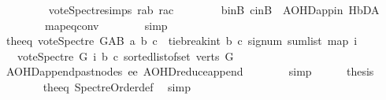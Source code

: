 \begin{isabellebody}
\ \ \ \ \ \ \isamarkupfalse%
\ \ vote{\isacharunderscore}{\kern0pt}Spectre{\isachardot}{\kern0pt}simps\ r{\isacharunderscore}{\kern0pt}ab\ r{\isacharunderscore}{\kern0pt}ac\isanewline
\ \ \ \ \ \ \ \ b{\isacharunderscore}{\kern0pt}inB\ c{\isacharunderscore}{\kern0pt}inB\ \ AOHD{\isachardot}{\kern0pt}app{\isacharunderscore}{\kern0pt}in{}\ H{}{\isachardot}{\kern0pt}bD{\isacharunderscore}{\kern0pt}A\isanewline
\ \ \ \ \ \ \ \ map{\isacharunderscore}{\kern0pt}eq{\isacharunderscore}{\kern0pt}conv\isanewline
\ \ \ \ \ \ \isamarkupfalse%
\ simp\ \isanewline
\ \ \ \ \isamarkupfalse%
\ the{\isacharunderscore}{\kern0pt}eq{\isacharcolon}{\kern0pt}\ {\isachardoublequoteopen}vote{\isacharunderscore}{\kern0pt}Spectre\ G{\isacharunderscore}{\kern0pt}AB\ a\ b\ c\ {\isacharequal}{\kern0pt}\ {\isacharparenleft}{\kern0pt}tie{\isacharunderscore}{\kern0pt}break{\isacharunderscore}{\kern0pt}int\ b\ c\ {\isacharparenleft}{\kern0pt}signum\ {\isacharparenleft}{\kern0pt}sum{\isacharunderscore}{\kern0pt}list\ {\isacharparenleft}{\kern0pt}map\ {\isacharparenleft}{\kern0pt}{\isasymlambda}i{\isachardot}{\kern0pt}\isanewline
\ \ \ {\isacharparenleft}{\kern0pt}vote{\isacharunderscore}{\kern0pt}Spectre\ G\ i\ b\ c{\isacharparenright}{\kern0pt}{\isacharparenright}{\kern0pt}\ {\isacharparenleft}{\kern0pt}sorted{\isacharunderscore}{\kern0pt}list{\isacharunderscore}{\kern0pt}of{\isacharunderscore}{\kern0pt}set\ {\isacharparenleft}{\kern0pt}verts\ G{\isacharparenright}{\kern0pt}{\isacharparenright}{\kern0pt}{\isacharparenright}{\kern0pt}{\isacharparenright}{\kern0pt}{\isacharparenright}{\kern0pt}{\isacharparenright}{\kern0pt}{\isachardoublequoteclose}\isanewline
\ \ \ \ \ \ \isamarkupfalse%
\ AOHD{\isachardot}{\kern0pt}append{\isacharunderscore}{\kern0pt}past{\isacharunderscore}{\kern0pt}nodes{}\ ee{}\ AOHD{\isachardot}{\kern0pt}reduce{\isacharunderscore}{\kern0pt}append{}\isanewline
\ \ \ \ \ \ \isamarkupfalse%
\ simp\isanewline
\ \ \ \ \isamarkupfalse%
\ {\isacharquery}{\kern0pt}thesis\ \isanewline
\ \ \ \ \ \ \isamarkupfalse%
\ the{\isacharunderscore}{\kern0pt}eq\ Spectre{\isacharunderscore}{\kern0pt}Order{\isacharunderscore}{\kern0pt}def\ \isamarkupfalse%
\ simp\ \isanewline
\ \ \isamarkupfalse%
\isanewline
{}\isamarkupfalse%
%
\endisatagproof
{\isafoldproof}%
%
\isadelimproof
\isanewline
%
\endisadelimproof
\isanewline
\isanewline
\isanewline
\isanewline
\isanewline

\end{isabellebody}
